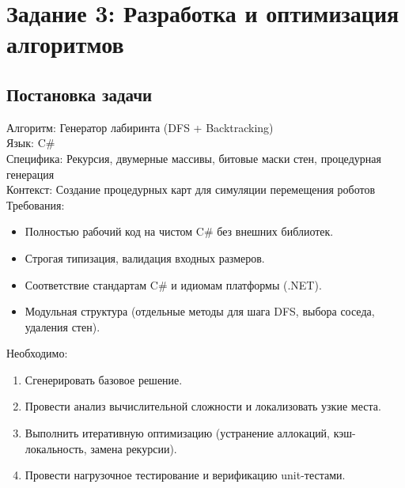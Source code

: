 \newpage
\section*{Задание 3: Разработка и оптимизация алгоритмов}
\subsection{Постановка задачи}
\noindent
Алгоритм: Генератор лабиринта (DFS + Backtracking) \\
Язык: C\# \\
Специфика: Рекурсия, двумерные массивы, битовые маски стен, процедурная генерация \\
Контекст: Создание процедурных карт для симуляции перемещения роботов\\
\vspace{0.5em}
Требования:
\begin{itemize}
\item Полностью рабочий код на чистом C\# без внешних библиотек.
\item Строгая типизация, валидация входных размеров.
\item Соответствие стандартам C\# и идиомам платформы (.NET).
\item Модульная структура (отдельные методы для шага DFS, выбора соседа, удаления стен).
\end{itemize}
\vspace{0.5em}
Необходимо:
\begin{enumerate}
\item Сгенерировать базовое решение.
\item Провести анализ вычислительной сложности и локализовать узкие места.
\item Выполнить итеративную оптимизацию (устранение аллокаций, кэш-локальность, замена рекурсии).
\item Провести нагрузочное тестирование и верификацию unit-тестами.
\end{enumerate}

